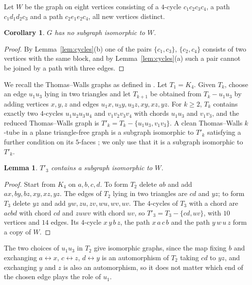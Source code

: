 \documentclass[11pt]{article}
\newtheorem{lemma}[theorem]{Lemma}
\newtheorem{corollary}[theorem]{Corollary}
\theoremstyle{remark}
\begin{document}
Let $W$ be the graph on eight vertices consisting of a $4$-cycle $c_1c_2c_3c_4$, a path $c_1d_1d_2c_3$ and a path $c_2e_1e_2c_4$, all new vertices distinct.

\begin{corollary}\label{cor:W}
$G$ has no subgraph isomorphic to $W$.
\end{corollary}

\begin{proof}
By Lemma~\ref{lem:cycles}(b) one of the pairs $\{c_1,c_3\}$, $\{c_2,c_4\}$ consists of two vertices with the same block, and by Lemma~\ref{lem:cycles}(a) such a pair cannot be joined by a path with three edges.
\end{proof}

We recall the Thomas--Walls graphs as defined in \cite{DV}. Let $T_1=K_4$. Given $T_k$, choose an edge $u_1u_3$ lying in two triangles and let $T_{k+1}$ be obtained from $T_k-u_1u_3$ by adding vertices $x,y,z$ and edges $u_1x,u_3y,u_3z,xy,xz,yz$. For $k\ge2$, $T_k$ contains exactly two $4$-cycles $u_1u_2u_3u_4$ and $v_1v_2v_3v_4$ with chords $u_1u_3$ and $v_1v_3$, and the reduced Thomas--Walls graph is $T'_k=T_k-\{u_1u_3,v_1v_3\}$. A clean Thomas--Walls $k$-tube in a plane triangle-free graph is a subgraph isomorphic to $T'_k$ satisfying a further condition on its $5$-faces \cite{DV}; we only use that it is a subgraph isomorphic to $T'_k$.

\begin{lemma}\label{lem:T3}
$T'_3$ contains a subgraph isomorphic to $W$.
\end{lemma}

\begin{proof}
Start from $K_4$ on $a,b,c,d$. To form $T_2$ delete $ab$ and add $ax,by,bz,xy,xz,yz$. The edges of $T_2$ lying in two triangles are $cd$ and $yz$; to form $T_3$ delete $yz$ and add $yw,zu,zv,wu,wv,uv$. The $4$-cycles of $T_3$ with a chord are $acbd$ with chord $cd$ and $zuwv$ with chord $uv$, so $T'_3=T_3-\{cd,uv\}$, with $10$ vertices and $14$ edges. Its $4$-cycle $x\,y\,b\,z$, the path $x\,a\,c\,b$ and the path $y\,w\,u\,z$ form a copy of $W$.
\end{proof}

The two choices of $u_1u_3$ in $T_2$ give isomorphic graphs, since the map fixing $b$ and exchanging $a\leftrightarrow x$, $c\leftrightarrow z$, $d\leftrightarrow y$ is an automorphism of $T_2$ taking $cd$ to $yz$, and exchanging $y$ and $z$ is also an automorphism, so it does not matter which end of the chosen edge plays the role of $u_1$.
\end{document}
